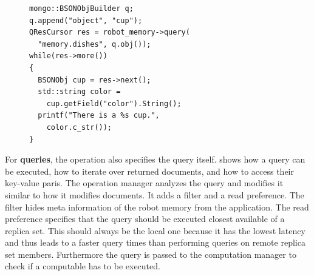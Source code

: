 \begin{figure}
  \vspace{-0.4cm}
\begin{lstlisting}[style=SmallCpp,
  caption={Query for printing all cup colors},
  label=lst:impl-query,
  framexleftmargin=5pt, xleftmargin=0pt,
 morekeywords={}, numbers=none]
mongo::BSONObjBuilder q;
q.append("object", "cup");
QResCursor res = robot_memory->query(
  "memory.dishes", q.obj());
while(res->more())
{
  BSONObj cup = res->next();
  std::string color = 
    cup.getField("color").String();
  printf("There is a %s cup.",
    color.c_str());
}
\end{lstlisting}
\vspace{-8mm}
\end{figure}
For \textbf{queries}, the operation also specifies the query
itself. 
shows how a query can be executed, how to iterate over returned
documents, and how to access their key-value paris.
The operation manager analyzes the query and modifies it similar
to how it modifies documents. It adds a filter and a read
preference. The filter hides meta information of the robot memory from
the application. The read preference specifies that the query should
be executed closest available of a replica set. This should always be
the local one because it has the lowest latency and thus leads to a
faster query times than performing queries on remote replica set
members. Furthermore the query is passed to the computation manager to
check if a computable has to be executed.

